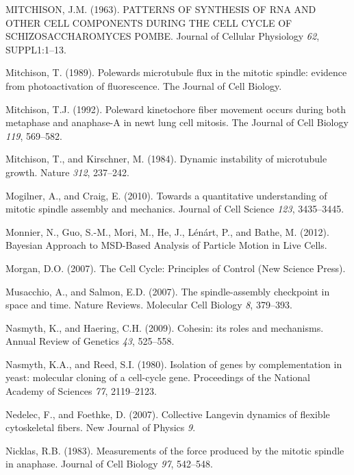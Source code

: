 \documentclass[12pt,a4paper,twoside,openright]{book}
\begin{document}
\hypertarget{ref-MITCHISON1963}{}
MITCHISON, J.M. (1963). PATTERNS OF SYNTHESIS OF RNA AND OTHER CELL
COMPONENTS DURING THE CELL CYCLE OF SCHIZOSACCHAROMYCES POMBE. Journal
of Cellular Physiology \emph{62}, SUPPL1:1--13.

\hypertarget{ref-Mitchison1989}{}
Mitchison, T. (1989). Polewards microtubule flux in the mitotic spindle:
evidence from photoactivation of fluorescence. The Journal of Cell
Biology.

\hypertarget{ref-Mitchison1992}{}
Mitchison, T.J. (1992). Poleward kinetochore fiber movement occurs
during both metaphase and anaphase-A in newt lung cell mitosis. The
Journal of Cell Biology \emph{119}, 569--582.

\hypertarget{ref-Mitchison1984}{}
Mitchison, T., and Kirschner, M. (1984). Dynamic instability of
microtubule growth. Nature \emph{312}, 237--242.

\hypertarget{ref-Mogilner2010}{}
Mogilner, A., and Craig, E. (2010). Towards a quantitative understanding
of mitotic spindle assembly and mechanics. Journal of Cell Science
\emph{123}, 3435--3445.

\hypertarget{ref-Monnier2012}{}
Monnier, N., Guo, S.-M., Mori, M., He, J., Lénárt, P., and Bathe, M.
(2012). Bayesian Approach to MSD-Based Analysis of Particle Motion in
Live Cells.

\hypertarget{ref-Morgan2007}{}
Morgan, D.O. (2007). The Cell Cycle: Principles of Control (New Science
Press).

\hypertarget{ref-Musacchio2007}{}
Musacchio, A., and Salmon, E.D. (2007). The spindle-assembly checkpoint
in space and time. Nature Reviews. Molecular Cell Biology \emph{8},
379--393.

\hypertarget{ref-Nasmyth2009}{}
Nasmyth, K., and Haering, C.H. (2009). Cohesin: its roles and
mechanisms. Annual Review of Genetics \emph{43}, 525--558.

\hypertarget{ref-Nasmyth1980}{}
Nasmyth, K.A., and Reed, S.I. (1980). Isolation of genes by
complementation in yeast: molecular cloning of a cell-cycle gene.
Proceedings of the National Academy of Sciences \emph{77}, 2119--2123.

\hypertarget{ref-Nedelec2007}{}
Nedelec, F., and Foethke, D. (2007). Collective Langevin dynamics of
flexible cytoskeletal fibers. New Journal of Physics \emph{9}.

\hypertarget{ref-Nicklas1983}{}
Nicklas, R.B. (1983). Measurements of the force produced by the mitotic
spindle in anaphase. Journal of Cell Biology \emph{97}, 542--548.
\end{document}
